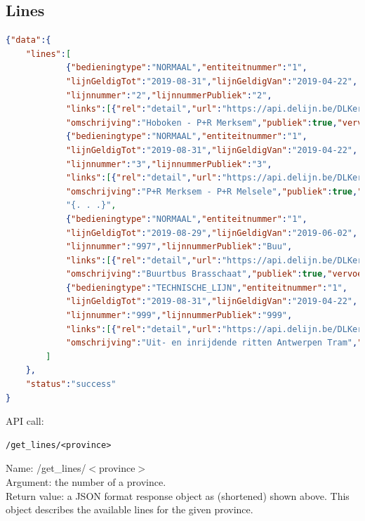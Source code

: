 \documentclass[12pt]{article}
\begin{document}
\subsection{Lines}
\begin{lstlisting}[language=json]
{"data":{
	"lines":[
			{"bedieningtype":"NORMAAL","entiteitnummer":"1",
			"lijnGeldigTot":"2019-08-31","lijnGeldigVan":"2019-04-22",
			"lijnnummer":"2","lijnnummerPubliek":"2",
			"links":[{"rel":"detail","url":"https://api.delijn.be/DLKernOpenData/v1/beta/lijnen/1/2"}],
			"omschrijving":"Hoboken - P+R Merksem","publiek":true,"vervoertype":"TRAM"},
			{"bedieningtype":"NORMAAL","entiteitnummer":"1",
			"lijnGeldigTot":"2019-08-31","lijnGeldigVan":"2019-04-22",
			"lijnnummer":"3","lijnnummerPubliek":"3",
			"links":[{"rel":"detail","url":"https://api.delijn.be/DLKernOpenData/v1/beta/lijnen/1/3"}],
			"omschrijving":"P+R Merksem - P+R Melsele","publiek":true,"vervoertype":"TRAM"},
			"{. . .}",
			{"bedieningtype":"NORMAAL","entiteitnummer":"1",
			"lijnGeldigTot":"2019-08-29","lijnGeldigVan":"2019-06-02",
			"lijnnummer":"997","lijnnummerPubliek":"Buu",
			"links":[{"rel":"detail","url":"https://api.delijn.be/DLKernOpenData/v1/beta/lijnen/1/997"}],
			"omschrijving":"Buurtbus Brasschaat","publiek":true,"vervoertype":"BUS"},
			{"bedieningtype":"TECHNISCHE_LIJN","entiteitnummer":"1",
			"lijnGeldigTot":"2019-08-31","lijnGeldigVan":"2019-04-22",
			"lijnnummer":"999","lijnnummerPubliek":"999",
			"links":[{"rel":"detail","url":"https://api.delijn.be/DLKernOpenData/v1/beta/lijnen/1/999"}],
			"omschrijving":"Uit- en inrijdende ritten Antwerpen Tram","publiek":false,"vervoertype":"BUS"}
		]
	},
	"status":"success"
}
\end{lstlisting}
API call:
\begin{lstlisting}[style=DOS]
/get_lines/<province>
\end{lstlisting}
Name: /get\_lines/$<$province$>$\\
Argument: the number of a province.\\
Return value: a JSON format response object as (shortened) shown above. This object describes the available lines for the given province.
\newpage
\end{document}
